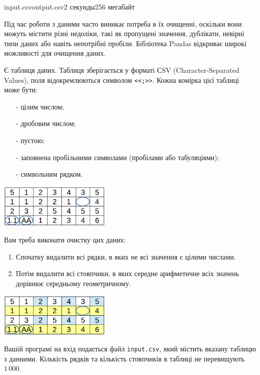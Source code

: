 \begin{problem}{}{input.csv}{output.csv}{2 секунды}{256 мегабайт}

Під час роботи з даними часто виникає потреба в їх очищенні, оскільки вони можуть містити різні недоліки, 
такі як пропущені значення, дублікати, невірні типи даних або навіть непотрібні пробіли.
Бібліотека Pandas відкриває широкі можливості для очищення даних.

Є таблиця даних. Таблиця зберігається у форматі СSV (Character-Separated Values), поля відокремлюються символом \texttt{<<;>>}.
Кожна комірка цієї таблиці може бути:
\begin{itemize}[topsep=0pt,itemsep=0pt,parsep=0pt,partopsep=0pt]
  \item[-] цілим числом;
  \item[-] дробовим числом;
  \item[-] пустою;
  \item[-] заповнена пробільними символами (пробілами або табуляціями);
  \item[-] символьним рядком.
\end{itemize}

\begin{center}
  \includegraphics[width=0.40\textwidth]{pic1.png}
\end{center}

Вам треба виконати очистку цих даних:
\begin{enumerate}
  \item Спочатку видалити всі рядки, в яких не всі значення є цілими числами.
  \item Потім видалити всі стовпчики, в яких середне арифметичне всіх значень дорівнює середньому геометричному.
\end{enumerate}

\begin{center}
  \includegraphics[width=0.40\textwidth]{pic2.png}
\end{center}

\InputFile
Вашій програмі на вхід подається файл \texttt{input.csv}, який містить вказану таблицю з данними.
Кількість рядків та кількість стовпчиків в таблиці не перевищують $1\,000$.


\end{problem}
